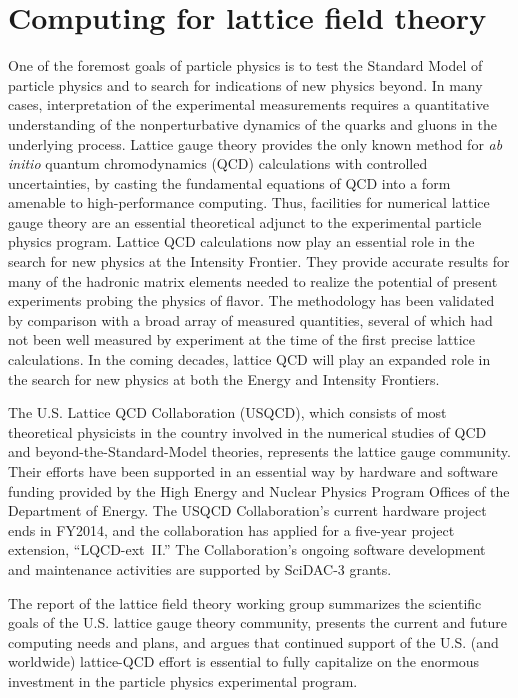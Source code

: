 
\section{Computing for lattice field theory}
\label{chap:LFT}


One of the foremost goals of particle physics is to test the Standard Model
of particle physics and to search for indications of new physics beyond. In
many cases, interpretation of the experimental measurements requires a
quantitative understanding of the nonperturbative dynamics of the quarks and
gluons in the underlying process.  Lattice gauge theory provides the only
known method for \emph{ab initio} quantum chromodynamics (QCD) calculations
with controlled uncertainties, by casting the fundamental equations of QCD
into a form amenable to high-performance computing.  Thus, facilities for
numerical lattice gauge theory are an essential theoretical adjunct to the
experimental particle physics program.  Lattice QCD calculations now play
an essential role in the search for new physics at the Intensity Frontier.
They provide accurate results for many of the hadronic matrix elements needed
to realize the potential of present experiments probing the physics of
flavor. The methodology has been validated by comparison with a broad array of
measured quantities, several of which had not been well measured by experiment
at the time of the first precise lattice
calculations.  In the coming decades, lattice QCD will
play an expanded role in the search for new physics at both the Energy and
Intensity Frontiers.

The U.S. Lattice QCD Collaboration (USQCD), which consists of
most theoretical physicists in the country involved in the numerical studies
of QCD and beyond-the-Standard-Model theories, represents the lattice gauge
community.  Their efforts have been supported in an essential way by hardware
and software funding provided by the High Energy and Nuclear Physics Program
Offices of the Department of Energy.  The USQCD Collaboration's current
hardware project ends in FY2014, and the collaboration has applied for a
five-year project extension, ``LQCD-ext~II.''  The Collaboration's ongoing
software development and maintenance activities are supported by SciDAC-3
grants.

The report of the lattice field theory working group \cite{Blum:2013mhx}
summarizes the scientific
goals of the U.S. lattice gauge theory community, presents the current and
future computing needs and plans, and argues that continued support of the
U.S. (and worldwide) lattice-QCD effort is essential to fully capitalize on
the enormous investment in the particle physics experimental program.

